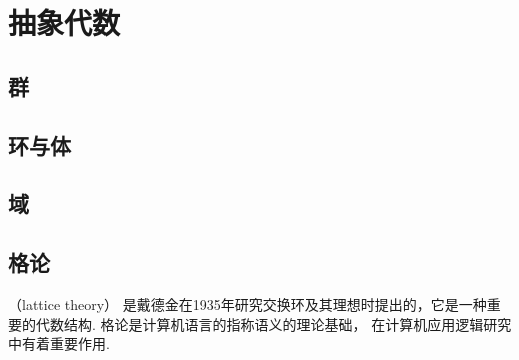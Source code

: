 \part{抽象代数}

\chapter{群}






\chapter{环与体}





\chapter{域}


\chapter{格论}
（lattice theory）
是戴德金在1935年研究交换环及其理想时提出的，它是一种重要的代数结构.
格论是计算机语言的指称语义的理论基础，
在计算机应用逻辑研究中有着重要作用.




